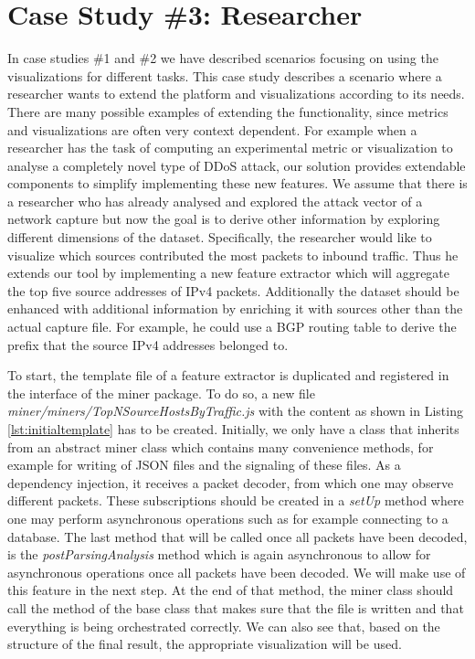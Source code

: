 \section{Case Study \#3: Researcher} \label{casestudyresearcher}
In case studies \#1 and \#2 we have described scenarios focusing on using the visualizations for different tasks. This case study describes a scenario where a researcher wants to extend the platform and visualizations according to its needs.
There are many possible examples of extending the functionality, since metrics and visualizations are often very context dependent. For example when a researcher has the task of computing an experimental metric or visualization to analyse a completely novel type of DDoS attack, our solution provides  extendable components to simplify implementing these new features.  We assume that there is a researcher who has already analysed and explored the attack vector of a network capture but now the goal is to derive other information by exploring different dimensions of the dataset. Specifically, the researcher would like to visualize which sources contributed the most packets to inbound traffic. Thus he extends our tool by implementing a new feature extractor which will aggregate the top five source addresses of IPv4 packets. Additionally the dataset should be enhanced with additional information by enriching it with sources other than the actual capture file. For example, he could use a BGP routing table to derive the prefix that the source IPv4 addresses belonged to.

To start, the template file of a feature extractor is duplicated and registered in the interface of the miner package. To do so, a new file \textit{miner/miners/TopNSourceHostsByTraffic.js} with the content as shown in Listing \ref{lst:initialtemplate} has to be created.
Initially, we only have a class that inherits from an abstract miner class which contains many convenience methods, for example for writing of JSON files and the signaling of these files. As a dependency injection, it receives a packet decoder, from which one may observe different packets. These subscriptions should be created in a \textit{setUp} method where one may perform asynchronous operations such as for example connecting to a database. The last method that will be called once all packets have been decoded, is the \textit{postParsingAnalysis} method which is again asynchronous to allow for asynchronous operations once all packets have been decoded. We will make use of this feature in the next step. At the end of that method, the miner class should call the method of the base class that makes sure that the file is written and that everything is being orchestrated correctly. We can also see that, based on the structure of the final result, the appropriate visualization will be used.



